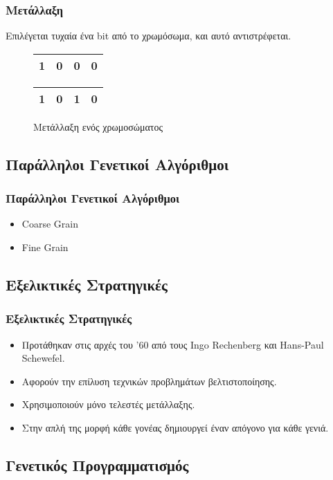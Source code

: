 \documentclass[xetex,mathserif,serif,14pt]{beamer}
\begin{document}
\begin{frame}
\frametitle{Μετάλλαξη}
Επιλέγεται τυχαία ένα bit από το χρωμόσωμα, και αυτό αντιστρέφεται.

\begin{figure}
    \begin{tabular}{|c|c|c|c|}
        \hline
        1 & 0 & 0 & 0\\
        \hline
    \end{tabular}
    \begin{tabular}{|c|c|c|c|}
        \hline
        1 & 0 & 1 & 0\\
        \hline
    \end{tabular}
    \caption{Μετάλλαξη ενός χρωμοσώματος}
    \label{fig_mutation}
\end{figure}
\end{frame}

\subsection{Παράλληλοι Γενετικοί Αλγόριθμοι}

\begin{frame}
\frametitle{Παράλληλοι Γενετικοί Αλγόριθμοι}
\begin{itemize}
  \item Coarse Grain
  \item Fine Grain
\end{itemize}
\end{frame}

\subsection{Εξελικτικές Στρατηγικές}

\begin{frame}
\frametitle{Εξελικτικές Στρατηγικές}
\begin{itemize}
  \item Προτάθηκαν στις αρχές του '60 από τους Ingo Rechenberg και Hans-Paul Schewefel.
  \item Αφορούν την επίλυση τεχνικών προβλημάτων βελτιστοποίησης.
  \item Χρησιμοποιούν μόνο τελεστές μετάλλαξης.
  \item Στην απλή της μορφή κάθε γονέας δημιουργεί έναν απόγονο για κάθε γενιά.
\end{itemize}
\end{frame}

\subsection{Γενετικός Προγραμματισμός}
\end{document}
